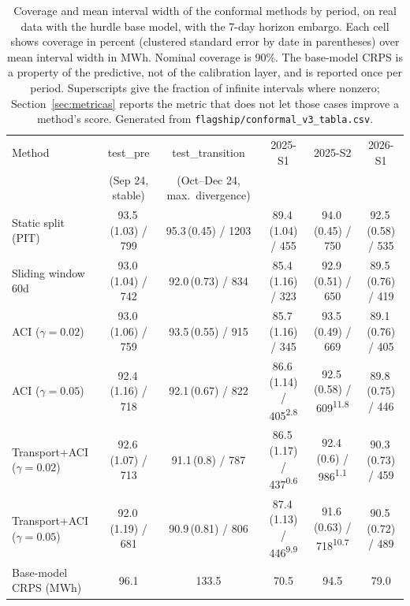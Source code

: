 \begin{table}[t]
\centering
\footnotesize
\caption{Coverage and mean interval width of the conformal methods by period, on real data with the hurdle base model, with the 7-day horizon embargo. Each cell shows coverage in percent (clustered standard error by date in parentheses) over mean interval width in MWh. Nominal coverage is 90\%. The base-model CRPS is a property of the predictive, not of the calibration layer, and is reported once per period. Superscripts give the fraction of infinite intervals where nonzero; Section~\ref{sec:metricas} reports the metric that does not let those cases improve a method's score. Generated from \texttt{flagship/conformal\_v3\_tabla.csv}.}
\label{tab:results}
\begin{tabular}{l@{\hspace{5pt}}c@{\hspace{5pt}}c@{\hspace{5pt}}c@{\hspace{5pt}}c@{\hspace{5pt}}c}
\toprule
Method & test\_pre & test\_transition & 2025-S1 & 2025-S2 & 2026-S1 \\
 & (Sep 24, stable) & (Oct--Dec 24, max.\ divergence) & & & \\
\midrule
Static split (PIT) & 93.5\,(1.03) / 799 & 95.3\,(0.45) / 1203 & 89.4\,(1.04) / 455 & 94.0\,(0.45) / 750 & 92.5\,(0.58) / 535 \\
Sliding window 60d & 93.0\,(1.04) / 742 & 92.0\,(0.73) / 834 & 85.4\,(1.16) / 323 & 92.9\,(0.51) / 650 & 89.5\,(0.76) / 419 \\
ACI ($\gamma{=}0.02$) & 93.0\,(1.06) / 759 & 93.5\,(0.55) / 915 & 85.7\,(1.16) / 345 & 93.5\,(0.49) / 669 & 89.1\,(0.76) / 405 \\
ACI ($\gamma{=}0.05$) & 92.4\,(1.16) / 718 & 92.1\,(0.67) / 822 & 86.6\,(1.14) / 405\textsuperscript{2.8} & 92.5\,(0.58) / 609\textsuperscript{11.8} & 89.8\,(0.75) / 446 \\
Transport+ACI ($\gamma{=}0.02$) & 92.6\,(1.07) / 713 & 91.1\,(0.8) / 787 & 86.5\,(1.17) / 437\textsuperscript{0.6} & 92.4\,(0.6) / 986\textsuperscript{1.1} & 90.3\,(0.73) / 459 \\
Transport+ACI ($\gamma{=}0.05$) & 92.0\,(1.19) / 681 & 90.9\,(0.81) / 806 & 87.4\,(1.13) / 446\textsuperscript{9.9} & 91.6\,(0.63) / 718\textsuperscript{10.7} & 90.5\,(0.72) / 489 \\
\midrule
Base-model CRPS (MWh) & 96.1 & 133.5 & 70.5 & 94.5 & 79.0 \\
\bottomrule
\end{tabular}
\end{table}
